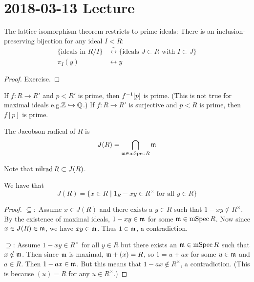 \section{2018-03-13 Lecture}

\begin{prop}[0.17]
	The lattice isomorphism theorem restricts to prime ideals:
	There is an inclusion-preserving bijection for any ideal $I<R$:
	\begin{align*}
	\{\text{ideals in } R/I\} &\overset{\sim}{\longleftrightarrow} \{\text{ideals } J \subset R \text{ with } I \subset J\} \\
	\pi_I(y) &\longleftrightarrow y
	\end{align*}
\end{prop}

\begin{proof}
	Exercise.
\end{proof}

\begin{rmk}
  	\leavevmode
	\begin{enum}
		\io If $f:R \to R'$ and $p<R'$ is prime, then $f^{-1}[p]$ is prime.
		(This is not true for maximal ideals e.g.\@ $\mathbb{Z} \hookrightarrow \mathbb{Q}$.)
		\io If $f:R \to R'$ is surjective and $p<R$ is prime, then $f[p]$ is prime.
	\end{enum}
\end{rmk}

\begin{defn}[0.18]
	The Jacobson radical of $R$ is
	\[J(R) = \bigcap_{\mathfrak{m} \in \operatorname{mSpec} R} \mathfrak{m}\]
\end{defn}

\begin{note}
	Note that $\operatorname{nilrad} R \subset J(R)$.
\end{note}

\begin{prop}[0.19]
	We have that
	\[J(R) = \{x \in R \mid 1_R - xy \in R^\times \text{ for all } y \in R\}\]
\end{prop}

\begin{proof}
	$\subseteq:$ Assume $x \in J(R)$ and there exists a $y \in R$ such that $1-xy \notin R^\times$.
	By the existence of maximal ideals, $1-xy \in \mathfrak{m}$ for some $\mathfrak{m} \in \operatorname{mSpec} R$.
	Now since $x \in J(R) \in \mathfrak{m}$, we have $xy \in \mathfrak{m}$.
	Thus $1 \in \mathfrak{m}$, a contradiction.
	
	$\supseteq$: Assume $1-xy \in R^\times$ for all $y \in R$ but there exists an $\mathfrak{m} \in \operatorname{mSpec} R$ such that $x \notin \mathfrak{m}$.
	Then since $\mathfrak{m}$ is maximal, $\mathfrak{m} + (x) = R$, so $1=u+ax$ for some $u \in \mathfrak{m}$ and $a \in R$.
	Then $1-ax \in \mathfrak{m}$.
	But this means that $1-ax \notin R^\times$, a contradiction.
	(This is because $(u)=R$ for any $u \in R^\times$.)
\end{proof}

